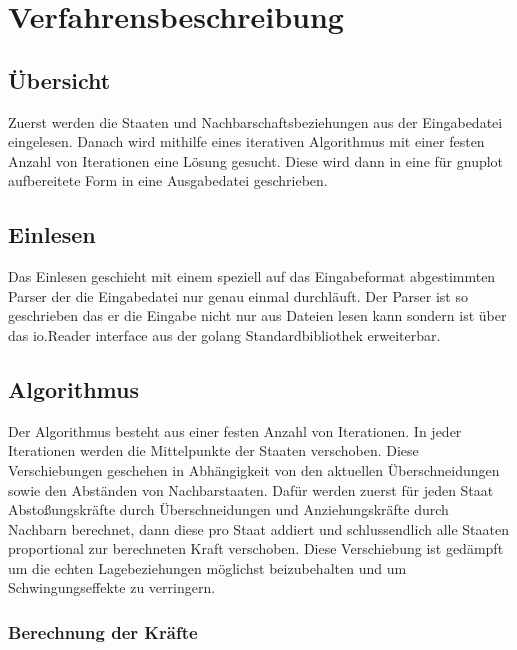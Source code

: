 \chapter{Verfahrensbeschreibung}
\label{chap:Verfahrensbeschreibung}

\section{Übersicht}

Zuerst werden die Staaten und Nachbarschaftsbeziehungen aus der Eingabedatei eingelesen.
Danach wird mithilfe eines iterativen Algorithmus mit einer festen Anzahl von Iterationen eine Lösung gesucht.
Diese wird dann in eine für gnuplot aufbereitete Form in eine Ausgabedatei geschrieben.

\section{Einlesen}

Das Einlesen geschieht mit einem speziell auf das Eingabeformat abgestimmten Parser der die Eingabedatei nur genau einmal durchläuft.
Der Parser ist so geschrieben das er die Eingabe nicht nur aus Dateien lesen kann sondern ist über das io.Reader interface aus der golang Standardbibliothek erweiterbar.

\section{Algorithmus}

Der Algorithmus besteht aus einer festen Anzahl von Iterationen. In jeder Iterationen werden die Mittelpunkte der Staaten verschoben.
Diese Verschiebungen geschehen in Abhängigkeit von den aktuellen Überschneidungen sowie den Abständen von Nachbarstaaten.
Dafür werden zuerst für jeden Staat Abstoßungskräfte durch Überschneidungen und Anziehungskräfte durch Nachbarn berechnet,
dann diese pro Staat addiert und schlussendlich alle Staaten proportional zur berechneten Kraft verschoben.
Diese Verschiebung ist gedämpft um die echten Lagebeziehungen möglichst beizubehalten und um Schwingungseffekte zu verringern.

\subsection{Berechnung der Kräfte}

